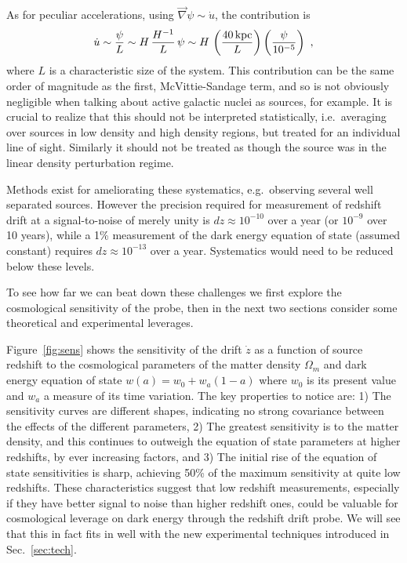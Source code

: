 \documentclass[preprint]{aastex}
\newcommand{\be}{\begin{equation}}
\newcommand{\ee}{\end{equation}}
\newcommand{\om}{\Omega_m}
\begin{document}
As for peculiar accelerations, using 
$\vec\nabla\psi\sim \dot u$, the contribution is 
\be 
\dot u \sim \frac{\psi}{L}\sim H\,\frac{H^{-1}}{L}\,\psi\sim H\, 
\left(\frac{40\,{\rm kpc}}{L}\right)\left(\frac{\psi}{10^{-5}}\right)\ , 
\ee 
where $L$ is a characteristic size of the system.  This contribution can be 
the same order of magnitude as the first, McVittie-Sandage term, and so is 
not obviously negligible when talking about active galactic nuclei as 
sources, for example. It is crucial to realize that this should not be 
interpreted statistically, i.e.\ averaging over sources in low density 
and high density regions, but treated for an individual line of sight. 
Similarly it should not be treated as though the source was in the linear 
density perturbation regime. 

Methods exist for ameliorating these systematics, e.g.\ observing several 
well separated sources.  However the precision required for measurement of 
redshift drift at a signal-to-noise of merely unity is 
$dz\approx 10^{-10}$ over a year (or $10^{-9}$ over 10 years), 
while a 1\% measurement of the dark energy equation of state (assumed 
constant) requires $dz\approx 10^{-13}$ over a year.  Systematics would 
need to be reduced below these levels. 

To see how far we can beat down these challenges we first explore the 
cosmological sensitivity of the probe, then in the next two sections 
consider some theoretical and experimental leverages. 

Figure~\ref{fig:sens} shows the sensitivity of the drift $\dot z$ as a 
function of source redshift to the cosmological parameters of the matter 
density $\om$ and dark energy equation of state $w(a)=w_0+w_a(1-a)$ where 
$w_0$ is its present value and $w_a$ a measure of its time variation. The 
key properties to notice are: 1) The sensitivity curves are different 
shapes, indicating no strong covariance between the effects of the different 
parameters, 2) The greatest sensitivity is to the matter density, and this 
continues to outweigh the equation of state parameters at higher redshifts, 
by ever increasing factors, and 3) The initial rise of the equation of 
state sensitivities is sharp, achieving 50\% of the maximum sensitivity 
at quite low redshifts. These characteristics suggest that low redshift 
measurements, especially if they have better signal to noise than higher 
redshift ones, could be valuable for cosmological leverage on dark energy 
through the redshift drift probe. We will see that this in fact fits in 
well with the new experimental techniques introduced in Sec.~\ref{sec:tech}. 
\end{document}
